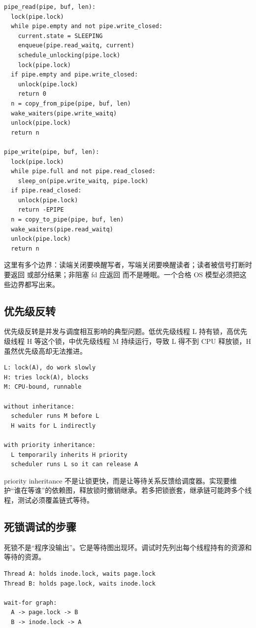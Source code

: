 \begin{lstlisting}
pipe_read(pipe, buf, len):
  lock(pipe.lock)
  while pipe.empty and not pipe.write_closed:
    current.state = SLEEPING
    enqueue(pipe.read_waitq, current)
    schedule_unlocking(pipe.lock)
    lock(pipe.lock)
  if pipe.empty and pipe.write_closed:
    unlock(pipe.lock)
    return 0
  n = copy_from_pipe(pipe, buf, len)
  wake_waiters(pipe.write_waitq)
  unlock(pipe.lock)
  return n

pipe_write(pipe, buf, len):
  lock(pipe.lock)
  while pipe.full and not pipe.read_closed:
    sleep_on(pipe.write_waitq, pipe.lock)
  if pipe.read_closed:
    unlock(pipe.lock)
    return -EPIPE
  n = copy_to_pipe(pipe, buf, len)
  wake_waiters(pipe.read_waitq)
  unlock(pipe.lock)
  return n
\end{lstlisting}

这里有多个边界：读端关闭要唤醒写者，写端关闭要唤醒读者；读者被信号打断时要返回  或部分结果；非阻塞 fd 应返回  而不是睡眠。一个合格 OS 模型必须把这些边界都写出来。

\subsection{优先级反转}

优先级反转是并发与调度相互影响的典型问题。低优先级线程 L 持有锁，高优先级线程 H 等这个锁，中优先级线程 M 持续运行，导致 L 得不到 CPU 释放锁，H 虽然优先级高却无法推进。

\begin{lstlisting}
L: lock(A), do work slowly
H: tries lock(A), blocks
M: CPU-bound, runnable

without inheritance:
  scheduler runs M before L
  H waits for L indirectly

with priority inheritance:
  L temporarily inherits H priority
  scheduler runs L so it can release A
\end{lstlisting}

priority inheritance 不是让锁更快，而是让等待关系反馈给调度器。实现要维护“谁在等谁”的依赖图，释放锁时撤销继承。若多把锁嵌套，继承链可能跨多个线程，测试必须覆盖链式等待。

\subsection{死锁调试的步骤}

死锁不是“程序没输出”。它是等待图出现环。调试时先列出每个线程持有的资源和等待的资源。

\begin{lstlisting}
Thread A: holds inode.lock, waits page.lock
Thread B: holds page.lock, waits inode.lock

wait-for graph:
  A -> page.lock -> B
  B -> inode.lock -> A
\end{lstlisting}

